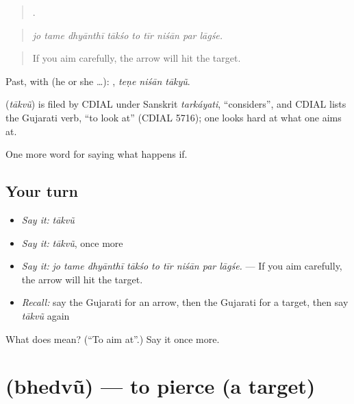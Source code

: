 \begin{quote}
        .
\end{quote}

\begin{quote}
\emph{jo tame dhyānthī tākśo to tīr niśān par lāgśe.}
\end{quote}

\begin{quote}
If you aim carefully, the arrow will hit the target.
\end{quote}

Past, with  (he or she …):   , \emph{teṇe niśān tākyũ}.

\begin{cousinweb}
\textbf{} (\emph{tākvũ}) is filed by CDIAL under Sanskrit \emph{tarkáyati}, \textquotedblleft{}considers\textquotedblright{}, and CDIAL lists the Gujarati verb, \textquotedblleft{}to look at\textquotedblright{} (CDIAL 5716); one looks hard at what one aims at.
\end{cousinweb}

\begin{grammarlens}[title={What you've built}]
One more word for saying what happens if.
\end{grammarlens}

\subsection*{Your turn}
\begin{itemize}
\raggedright
  \item \emph{Say it:} \emph{tākvũ}
  \item \emph{Say it:} \emph{tākvũ}, once more
  \item \emph{Say it:} \emph{jo tame dhyānthī tākśo to tīr niśān par lāgśe.} — If you aim carefully, the arrow will hit the target.
  \item \emph{Recall:} say the Gujarati for an arrow, then the Gujarati for a target, then say \emph{tākvũ} again
\end{itemize}

\begin{tcolorbox}[breakable,colback=teal!4,colframe=teal!35!black,title={Before you move on}]
What does  mean? (\textquotedblleft{}To aim at\textquotedblright{}.) Say it once more.
\end{tcolorbox}
\section[\texorpdfstring{\gu{ભેદવું} (bhedvũ)}{ભેદવું (bhedvũ)}]{ (bhedvũ) — to pierce (a target)}

